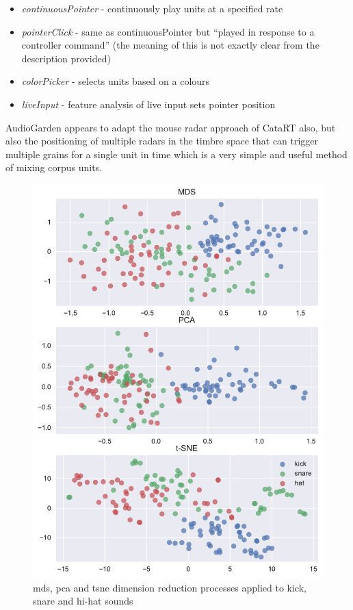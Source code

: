  \begin{itemize}
  \item \textit{continuousPointer} - continuously play units at a specified rate
  \item \textit{pointerClick} - same as continuousPointer but ``played in response to a controller command'' (the meaning of this is not exactly clear from the description provided)
  \item \textit{colorPicker} - selects units based on a colours 
  \item \textit{liveInput} - feature analysis of live input sets pointer position
\end{itemize} 

AudioGarden appears to adapt the mouse radar approach of CataRT also, but also the positioning of multiple radars in the timbre space that can trigger multiple grains for a single unit in time which is a very simple and useful method of mixing corpus units.

\begin{figure}
	\begin{center}
		\includegraphics[width=1.0\textwidth]{ch06_rhythmcat/figures/dimension_reductions.pdf}
	\end{center}
	\caption[MDS, PCA and t-SNE Dimension Reduction on Kick,Snare and Hat Sounds]{\acrshort{mds}, \acrshort{pca} and \acrshort{tsne} dimension reduction processes applied to kick, snare and hi-hat sounds}
	\label{fig:dimension_reductions}
\end{figure}

